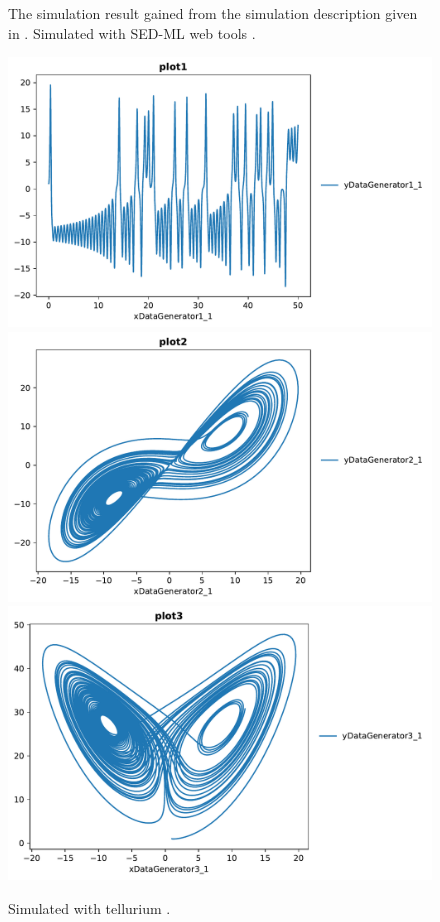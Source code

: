 \begin{figure}[ht]
\begin{minipage}{0.47\textwidth}
        \caption{The simulation result gained from the simulation description given in . Simulated with SED-ML web tools \citep{bergmann2017sed}.}
    \end{minipage}\hfill
    \begin{minipage}{0.47\textwidth}
        \centering
        \includegraphics[width=1.0\textwidth]{examples/lorenz-sbml/results/tellurium/plot1}
        \includegraphics[width=1.0\textwidth]{examples/lorenz-sbml/results/tellurium/plot2}
		\includegraphics[width=1.0\textwidth]{examples/lorenz-sbml/results/tellurium/plot3}
        \caption{Simulated with tellurium \citep{tellurium}.}
    \end{minipage}
    \label{fig:lorenz-sbml}
\end{figure}

